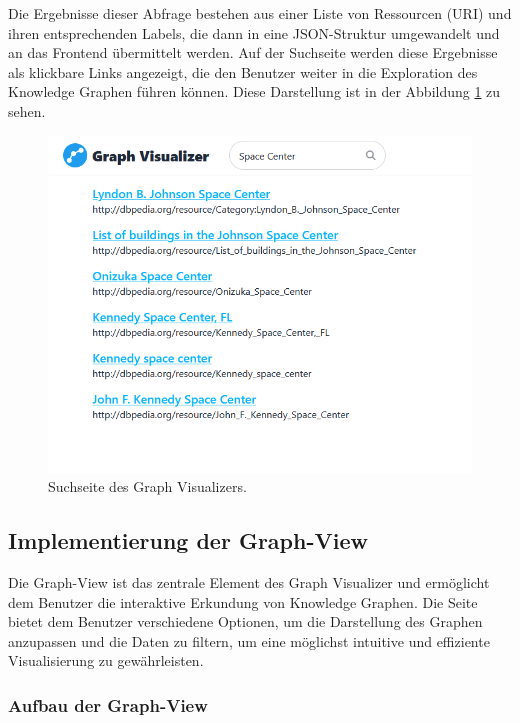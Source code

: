 Die Ergebnisse dieser Abfrage bestehen aus einer Liste von Ressourcen (URI) und ihren entsprechenden Labels, die dann in eine JSON-Struktur umgewandelt und an das Frontend übermittelt werden. Auf der Suchseite werden diese Ergebnisse als klickbare Links angezeigt, die den Benutzer weiter in die Exploration des Knowledge Graphen führen können. Diese Darstellung ist in der Abbildung \ref{fig:realization:implementation:searchpage} zu sehen.

\begin{figure}[h]
    \centering
    \includegraphics[height=.8\textwidth]{images/03/SearchResults.png}
    \caption{Suchseite des Graph Visualizers.}
    \label{fig:realization:implementation:searchpage}
\end{figure}

\subsection{Implementierung der Graph-View}

Die Graph-View ist das zentrale Element des Graph Visualizer und ermöglicht dem Benutzer die interaktive Erkundung von Knowledge Graphen. Die Seite bietet dem Benutzer verschiedene Optionen, um die Darstellung des Graphen anzupassen und die Daten zu filtern, um eine möglichst intuitive und effiziente Visualisierung zu gewährleisten.

\subsubsection{Aufbau der Graph-View}

